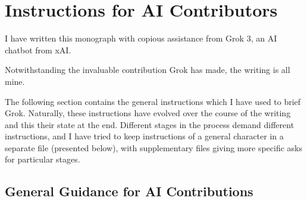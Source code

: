 \documentclass[10pt,titlepage]{book}
\begin{document}



\chapter{Instructions for AI Contributors}\label{InstructionsForAIContributors}

I have written this monograph with copious assistance from Grok 3, an AI chatbot from xAI.

Notwithstanding the invaluable contribution Grok has made, the writing is all mine.

The following section contains the general instructions which I have used to brief Grok.
Naturally, these instructions have evolved over the course of the writing and this their state at the end.
Different stages in the process demand different instructions, and I have tried to keep instructions of a general character  in a separate file (presented below), with supplementary files giving more specific asks for particular stages.

\section{General Guidance for AI Contributions}





\listoftables

{}
\printbibliography[title={Bibliography}]

\renewcommand{\indexname}{Index of Defined Terms}
{\twocolumn[]
{\small\printindex}}


\end{document}
